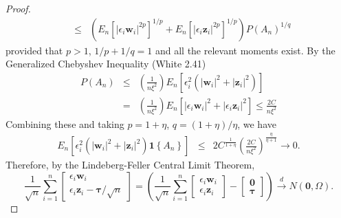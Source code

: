 \documentclass[12pt]{article}
\theoremstyle{definition}
\begin{document}
\begin{proof}
\begin{eqnarray*}
    &\leq& \left(E_n \left[\left|\epsilon_i \mathbf{w}_i\right|^{2p} \right]^{1/p} + E_n\left[ \left|\epsilon_i \mathbf{z}_i\right|^{2p}\right]^{1/p}\right)P(A_n)^{1/q}
  \end{eqnarray*}
provided that $p>1$, $1/p + 1/q = 1$ and all the relevant moments exist. By the Generalized Chebyshev Inequality (White 2.41) 
    \begin{eqnarray*}
      P(A_n) &\leq& \left( \frac{1}{n\xi^2}\right) E_n\left[\epsilon_i^2 \left(\left|\mathbf{w}_i \right|^2 + \left|\mathbf{z}_i \right|^2\right) \right]\\
      &=& \left( \frac{1}{n\xi^2}\right) E_n\left[\left|\epsilon_i \mathbf{w}_i \right|^2 + \left| \epsilon_i \mathbf{z}_i \right|^2\right] \leq \frac{2C}{n\xi^2}
    \end{eqnarray*}
Combining these and taking $p = 1+\eta$, $q = (1+\eta)/\eta$, we have
  \begin{eqnarray*}
  E_n \left[\epsilon_i^2 \left(\left|\mathbf{w}_i \right|^2 + \left| \mathbf{z}_i\right|^2 \right) \mathbf{1} \left\{A_n\right\}\right] &\leq& 2C^{\frac{1}{1+\eta}} \left(\frac{2C}{n\xi^2} \right)^{\frac{\eta}{\eta+1}} \rightarrow 0.
  \end{eqnarray*}
Therefore, by the Lindeberg-Feller Central Limit Theorem,
  $$\frac{1}{\sqrt{n}} \sum_{i=1}^n \left[\begin{array}{c} \epsilon_i \mathbf{w}_i \\ \epsilon_i \mathbf{z}_i - \boldsymbol{\tau}/\sqrt{n}\end{array} \right] = \left(\frac{1}{\sqrt{n}} \sum_{i=1}^n \left[\begin{array}{c} \epsilon_i \mathbf{w}_i \\ \epsilon_i \mathbf{z}_i \end{array} \right] - \left[\begin{array}{c}\mathbf{0}\\ \boldsymbol{\tau} \end{array} \right] \right)\overset{d}{\rightarrow} N(\mathbf{0}, \Omega).$$
\end{proof}
\end{document}
